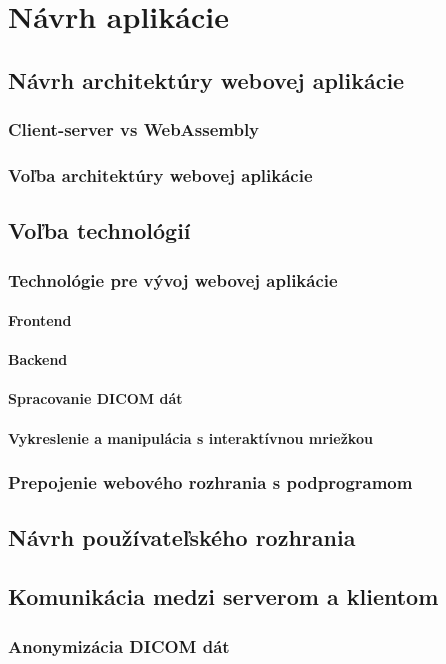 \chapter {Návrh aplikácie}

\section {Návrh architektúry webovej aplikácie}

\subsection {Client-server vs WebAssembly}

\subsection {Voľba architektúry webovej aplikácie}

\section {Voľba technológií}

\subsection {Technológie pre vývoj webovej aplikácie}

\subsubsection {Frontend}

\subsubsection {Backend}

\subsubsection {Spracovanie DICOM dát}

\subsubsection {Vykreslenie a manipulácia s interaktívnou mriežkou}

\subsection {Prepojenie webového rozhrania s podprogramom}

\section {Návrh používateľského rozhrania}

\section {Komunikácia medzi serverom a klientom}

\subsection {Anonymizácia DICOM dát}